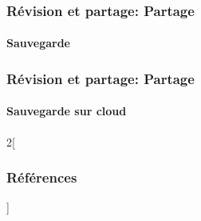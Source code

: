 \documentclass[xcolor=table]{beamer}
\begin{document}
\begin{frame}
\frametitle{Révision et partage: Partage}
\framesubtitle{Sauvegarde}

\end{frame}

\begin{frame}
\frametitle{Révision et partage: Partage}
\framesubtitle{Sauvegarde sur cloud}


\end{frame}

\nocite{*}
%
% 

\begin{multicols*}{2}[\frametitle{Références}]%
	\tiny
	
	
\end{multicols*}
\end{document}
